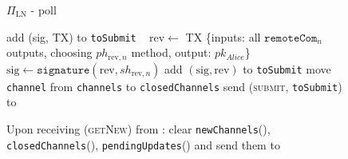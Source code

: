 \begin{figure}[H]
\begin{protocolbox}{$\Pi_{\mathrm{LN}}$ - poll}
\begin{algorithmic}[1]
                  \State add (sig, TX) to \texttt{toSubmit}
                \EndIf
              \EndFor
            \Else \ 
              \State $\mathrm{rev} \gets$ TX \{inputs: all
              $\mathtt{remoteCom}_n$ outputs, choosing $ph_{\mathrm{rev}, n}$
              method, output: $pk_{\mathit{Alice}}$\}
              \State $\mathrm{sig} \gets \mathtt{signature}\left(\mathrm{rev},
              sh_{\mathrm{rev}, n}\right)$
              \State add $\left(\mathrm{sig}, \mathrm{rev}\right)$ to
              \texttt{toSubmit}
            \EndIf
            \State move \texttt{channel} from \texttt{channels} to
            \texttt{closedChannels}
          \EndFor
          \State send (\textsc{submit}, \texttt{toSubmit}) to \ledger
        \EndIndent
        \Statex

        \State Upon receiving (\textsc{getNew}) from \alice:
        \Indent
          \State clear \texttt{newChannels}(\alice),
          \texttt{closedChannels}(\alice), \texttt{pendingUpdates}(\alice) and
          send them to \alice
        \EndIndent
      \end{algorithmic}
    \end{protocolbox}
    \caption{}
    \label{alg:protocol:poll}
  \end{figure}

